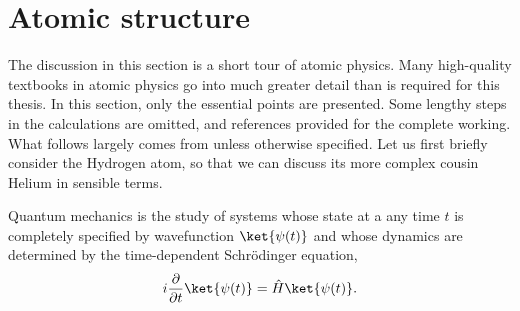 \section{Atomic structure}

	The discussion in this section is a short tour of atomic physics. Many high-quality textbooks in atomic physics go into much greater detail than is required for this thesis. In this section, only the essential points are presented. Some lengthy steps in the calculations are omitted, and references provided for the complete working. What follows largely comes from \cite{FootAtomic,BinneyBook} unless otherwise specified. Let us first briefly consider the Hydrogen atom, so that we can discuss its more complex cousin Helium in sensible terms. 

	Quantum mechanics is the study of systems whose state at a any time $t$ is completely specified by wavefunction $\ket{\psi(t)}$ and whose dynamics are determined by the time-dependent Schr\"{o}dinger equation,
	\begin{equation}
		i\frac{\partial}{\partial t}\ket{\psi(t)} = \hat{H}\ket{\psi(t)}.
		\label{eqn:TDSE}
	\end{equation}


